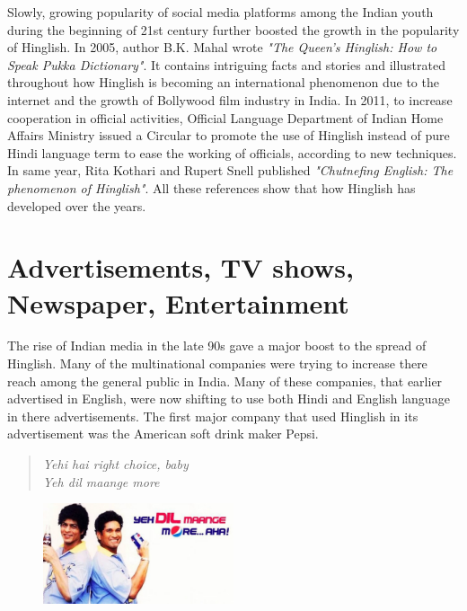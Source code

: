 \documentclass{article}
\begin{document}
Slowly, growing popularity of social media platforms among the Indian youth during the beginning of 21st century further boosted the growth in the popularity of Hinglish. In 2005, author B.K. Mahal wrote \textit{"The Queen's Hinglish: How to Speak Pukka Dictionary"}. It contains intriguing facts and stories and illustrated throughout how Hinglish is becoming an international phenomenon due to the internet and the growth of Bollywood film industry in India. In 2011, to increase cooperation in official activities, Official Language Department of Indian Home Affairs Ministry issued a Circular to promote the use of Hinglish instead of pure Hindi language term to ease the working of officials, according to new techniques. In same year, Rita Kothari and Rupert Snell published \textit{"Chutnefing English: The phenomenon of Hinglish"}. All these references show that how Hinglish has developed over the years.

\section{Advertisements, TV shows, Newspaper, Entertainment}
The rise of Indian media in the late 90s gave a major boost to the spread of Hinglish. Many of the multinational companies were trying to increase there reach among the general public in India. Many of these companies, that earlier advertised in English, were now shifting to use both Hindi and English language in there advertisements. The first major company that used Hinglish in its advertisement was the American soft drink maker Pepsi.
\begin{quote}
    \centering
    \textit{Yehi hai right choice, baby}\\
\textit{Yeh dil maange more}
\end{quote}

\begin{figure}[H]
\centering
\includegraphics[width=0.5\textwidth]{images/pepsi.jpg}
\end{figure}
\end{document}
